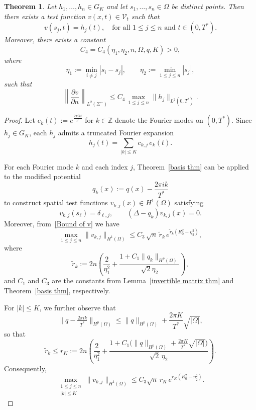 \documentclass[12pt]{amsart}
\newtheorem{thm}{Theorem}
\begin{document}
\begin{thm}\label{para basis thm}
Let \(h_1,\ldots,h_n \in G_K\) and let \(s_1,\ldots,s_n \in \Omega\) be distinct points. Then there exists a test function \(v(x,t)\in\mathcal{V}_t\) such that
\[
v(s_j, t) = h_j(t), \quad \text{for all } 1 \leq j \leq n \text{ and } t \in (0, T^*).
\]
Moreover, there exists a constant
\[
C_4 = C_4(\eta_1,\eta_2,n,\Omega,q,K) > 0,
\]
where 
\[
\eta_1 := \min_{i \neq j} |s_i - s_j|, 
\qquad 
\eta_2 := \min_{1 \le j\le n} |s_j|,
\]
such that
\begin{equation}\label{para Bound of v}
    \left\| \frac{\partial v}{\partial n} \right\|_{L^2(\Sigma^-)} 
    \leq C_4 \,\max_{1 \leq j \leq n} \| h_j \|_{L^2(0, T^*)}.
\end{equation}
\end{thm}
\begin{proof}
    Let \(e_k(t) := e^{\frac{2\pi i k t}{T^*}}\) for \(k\in\mathbb{Z}\) denote the Fourier modes on \((0,T^*)\).
    Since \(h_j \in G_K\), each \(h_j\) admits a truncated Fourier expansion
    \[
        h_j(t) = \sum_{|k|\le K} c_{k,j}\, e_k(t).
    \]

    For each Fourier mode \(k\) and each index \(j\), Theorem~\ref{basis thm} can be applied to the modified potential
    \[
        q_k(x) := q(x) - \frac{2\pi i k}{T^*}
    \]
    to construct spatial test functions \(v_{k,j}(x)\in H^1(\Omega)\) satisfying
    \begin{equation*}
        v_{k,j}(s_\ell) = \delta_{\ell,j},
        \qquad
        (\Delta - q_k)v_{k,j}(x) = 0.
    \end{equation*}
    Moreover, from~\eqref{Bound of v} we have
    \[
        \max_{1\le j\le n} \|v_{k,j}\|_{H^1(\Omega)}
        \le C_3\,\sqrt{n}\,\tilde r_k\, e^{\tilde r_k(R_0^2 - \eta_2^2)},
    \]
    where
    \[
    \tilde r_k 
        := 2n \left( \frac{2}{\eta_1^2} 
            + \frac{1 + C_1 \|q_k\|_{H^p(\Omega)}}{\sqrt{2} \eta_2} \right),
    \]
    and \(C_1\) and \(C_3\) are the constants from Lemma~\ref{invertible matrix thm} and Theorem~\ref{basis thm}, respectively.

    For \(|k|\le K\), we further observe that
    \[
        \|q - \tfrac{2\pi i k}{T^*}\|_{H^p(\Omega)}
        \le \|q\|_{H^p(\Omega)} + \frac{2\pi K}{T^*}\sqrt{|\Omega|},
    \]
    so that
    \[
        \tilde r_k \le r_K 
        := 2n\left(
            \frac{2}{\eta_1^2}
            + \frac{1 + C_1\bigl(\|q\|_{H^p(\Omega)} + \frac{2\pi K}{T^*}\sqrt{|\Omega|}\bigr)}{\sqrt{2}\,\eta_2}
        \right).
    \]
    Consequently,
    \begin{equation}\label{uniform vk bound}
    \max_{\substack{1 \leq j \leq n \\ |k| \leq K}} 
        \|v_{k,j}\|_{H^1(\Omega)} 
        \leq C_3 \sqrt{n}\, r_K\, e^{r_K(R_0^2 - \eta_2^2)}.
    \end{equation}
    

\end{proof}
\end{document}
